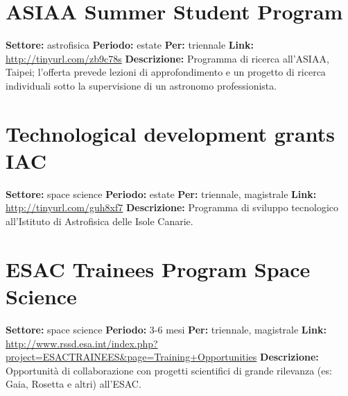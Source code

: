 \documentclass[a4paper,10pt]{article}
\begin{document}
\section{ASIAA Summer Student Program}
\textbf{Settore:} astrofisica\newline
\textbf{Periodo:} estate \newline
\textbf{Per:} triennale\newline
\textbf{Link:} \url{http://tinyurl.com/zb9c78s} \newline
\textbf{Descrizione:} Programma di ricerca all'ASIAA, Taipei; l'offerta prevede lezioni di approfondimento e un progetto di ricerca individuali sotto la supervisione di un astronomo professionista. 

\section{Technological development grants IAC}
\textbf{Settore:} space science\newline
\textbf{Periodo:} estate\newline
\textbf{Per:} triennale, magistrale\newline
\textbf{Link:} \url{http://tinyurl.com/guh8xf7} \newline
\textbf{Descrizione:} Programma di sviluppo tecnologico all'Istituto di Astrofisica delle Isole Canarie.  

\section{ESAC Trainees Program Space Science}
\textbf{Settore:} space science \newline
\textbf{Periodo:} 3-6 mesi \newline
\textbf{Per:} triennale, magistrale \newline
\textbf{Link:} \url{http://www.rssd.esa.int/index.php?project=ESACTRAINEES&page=Training+Opportunities} \newline
\textbf{Descrizione:} Opportunità di collaborazione con progetti scientifici di grande rilevanza (es: Gaia, Rosetta e altri) all'ESAC.  
\end{document}
